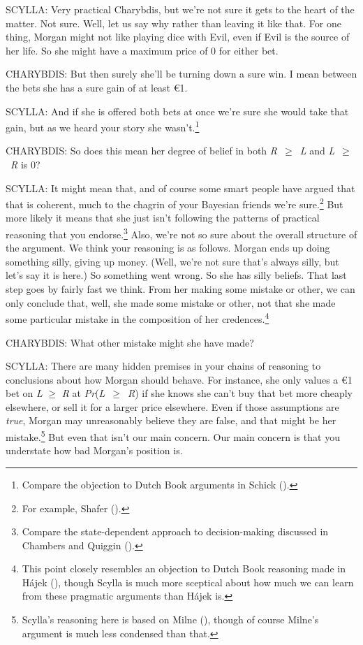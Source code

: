 \documentclass[
  11pt,
  letterpaper,
  DIV=11,
  numbers=noendperiod,
  twoside]{scrartcl}
\begin{document}
SCYLLA: Very practical Charybdis, but we're not sure it gets to the
heart of the matter. Not sure. Well, let us say why rather than leaving
it like that. For one thing, Morgan might not like playing dice with
Evil, even if Evil is the source of her life. So she might have a
maximum price of 0 for either bet.

CHARYBDIS: But then surely she'll be turning down a sure win. I mean
between the bets she has a sure gain of at least €1.

SCYLLA: And if she is offered both bets at once we're sure she would
take that gain, but as we heard your story she wasn't.\footnote{Compare
  the objection to Dutch Book arguments in Schick
  ().}

CHARYBDIS: So does this mean her degree of belief in both
\emph{R}~\({\geq}\)~\emph{L} and \emph{L}~\({\geq}\)~\emph{R} is 0?

SCYLLA: It might mean that, and of course some smart people have argued
that that is coherent, much to the chagrin of your Bayesian friends
we're sure.\footnote{For example, Shafer
  ().} But more likely it means that she
just isn't following the patterns of practical reasoning that you
endorse.\footnote{Compare the state-dependent approach to
  decision-making discussed in Chambers and Quiggin
  ().} Also, we're not so sure
about the overall structure of the argument. We think your reasoning is
as follows. Morgan ends up doing something silly, giving up money.
(Well, we're not sure that's always silly, but let's say it is here.) So
something went wrong. So she has silly beliefs. That last step goes by
fairly fast we think. From her making some mistake or other, we can only
conclude that, well, she made some mistake or other, not that she made
some particular mistake in the composition of her credences.\footnote{This
  point closely resembles an objection to Dutch Book reasoning made in
  Hájek (), though Scylla is much more
  sceptical about how much we can learn from these pragmatic arguments
  than Hájek is.}

CHARYBDIS: What other mistake might she have made?

SCYLLA: There are many hidden premises in your chains of reasoning to
conclusions about how Morgan should behave. For instance, she only
values a €1 bet on \emph{L} \({\geq}\) \emph{R} at
\emph{Pr}(\emph{L}~\({\geq}\)~\emph{R}) if she knows she can't buy that
bet more cheaply elsewhere, or sell it for a larger price elsewhere.
Even if those assumptions are \emph{true}, Morgan may unreasonably
believe they are false, and that might be her mistake.\footnote{Scylla's
  reasoning here is based on Milne (),
  though of course Milne's argument is much less condensed than that.}
But even that isn't our main concern. Our main concern is that you
understate how bad Morgan's position is.
\end{document}
